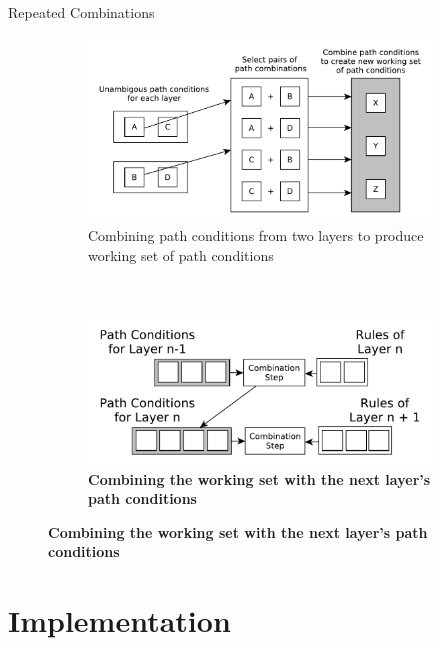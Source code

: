 \documentclass[xcolor=dvipsnames, 14pt]{beamer}
\begin{document}
\begin{frame}{Repeated Combinations}
\begin{figure}[htb]
        \centering
        \begin{subfigure}[b]{0.55\textwidth}
                \centering
                \includegraphics[width=1\textwidth]{../figures/building_path_conditions/combining_path_conditions.pdf}
                \caption{Combining path conditions from two layers to produce working set of path conditions}
                \label{fig:create_working_set}
        \end{subfigure}%
        ~
        \begin{subfigure}[b]{0.42\textwidth}
                \centering
                \includegraphics[width=1\textwidth]{../figures/building_path_conditions/next_layer.pdf}
                \caption{\textbf{Combining the working set with the next layer's path conditions}}
                \label{fig:combine_working_set}
        \end{subfigure}%
        \label{fig:combining_path_conditions}
\end{figure}
\end{frame}

\section{Implementation}
\end{document}
